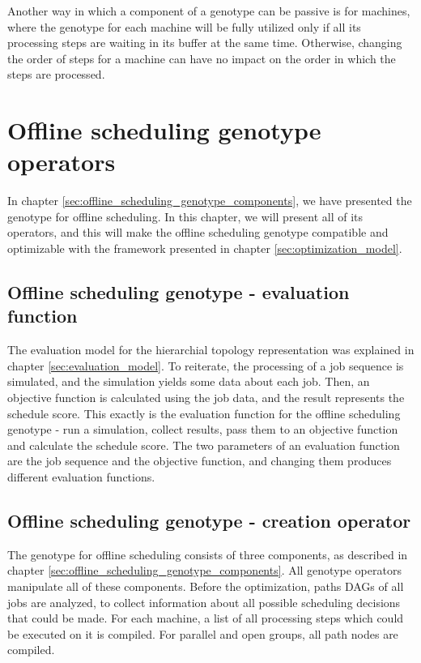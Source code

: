 Another way in which a component of a genotype can be passive is for machines, where the genotype for each machine will be fully utilized only if all its processing steps are waiting in its buffer at the same time. Otherwise, changing the order of steps for a machine can have no impact on the order in which the steps are processed.

\section{Offline scheduling genotype operators}
\label{sec:offline_scheduling_genotype_operators}

In chapter \ref{sec:offline_scheduling_genotype_components}, we have presented the genotype for offline scheduling. In this chapter, we will present all of its operators, and this will make the offline scheduling genotype compatible and optimizable with the framework presented in chapter \ref{sec:optimization_model}.

\subsection{Offline scheduling genotype - evaluation function}
\label{sec:offline_scheduling_genotype_evaluation_function}
The evaluation model for the hierarchial topology representation was explained in chapter \ref{sec:evaluation_model}. To reiterate, the processing of a job sequence is simulated, and the simulation yields some data about each job. Then, an objective function is calculated using the job data, and the result represents the schedule score. This exactly is the evaluation function for the offline scheduling genotype - run a simulation, collect results, pass them to an objective function and calculate the schedule score. The two parameters of an evaluation function are the job sequence and the objective function, and changing them produces different evaluation functions.

\subsection{Offline scheduling genotype - creation operator}
The genotype for offline scheduling consists of three components, as described in chapter \ref{sec:offline_scheduling_genotype_components}. All genotype operators manipulate all of these components. Before the optimization, paths DAGs of all jobs are analyzed, to collect information about all possible scheduling decisions that could be made. For each machine, a list of all processing steps which could be executed on it is compiled. For parallel and open groups, all path nodes are compiled.


